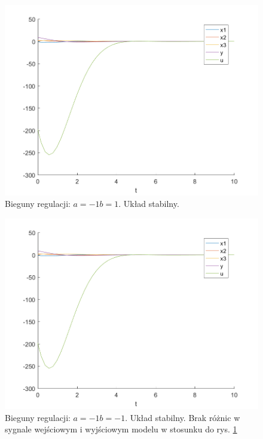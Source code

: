 \documentclass{article}
\begin{document}
\begin{figure}[H]
\centering
\includegraphics[width=0.9\linewidth]{z6_-1,1}
\caption{Bieguny regulacji: $a = -1 b = 1$. Układ stabilny.}
\label{fig:z6-11}
\end{figure}

\begin{figure}[H]
\centering
\includegraphics[width=0.9\linewidth]{z6_-1,-1}
\caption{Bieguny regulacji: $a = -1 b = -1$. Układ stabilny. Brak różnic w sygnale wejściowym i wyjściowym modelu w stosunku do rys. \ref{fig:z6-11}}
\label{fig:z6-1-1}
\end{figure}
\end{document}
